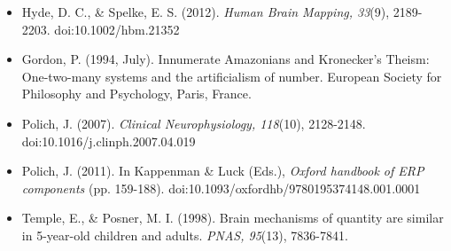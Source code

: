 \vspace{0.12in}

\begin{tcolorbox}[posterbox]
{\fontsize{14}{17}\selectfont
\begin{itemize}
  \item Hyde, D. C., \& Spelke, E. S. (2012). \textit{Human Brain Mapping, 33}(9), 2189-2203. doi:10.1002/hbm.21352
  \item Gordon, P. (1994, July). Innumerate Amazonians and Kronecker's Theism: One-two-many systems and the artificialism of number. European Society for Philosophy and Psychology, Paris, France.
  \item Polich, J. (2007). \textit{Clinical Neurophysiology, 118}(10), 2128-2148. doi:10.1016/j.clinph.2007.04.019
  \item Polich, J. (2011). In Kappenman \& Luck (Eds.), \textit{Oxford handbook of ERP components} (pp. 159-188). doi:10.1093/oxfordhb/9780195374148.001.0001
  \item Temple, E., \& Posner, M. I. (1998). Brain mechanisms of quantity are similar in 5-year-old children and adults. \textit{PNAS, 95}(13), 7836-7841.
\end{itemize}
}
\end{tcolorbox}

